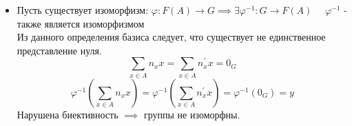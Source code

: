 \documentclass{article}
\begin{document}
\begin{enumerate}
\begin{itemize}
        \item
        Пусть существует изоморфизм: $\varphi: F(A) \to G \implies \exists \varphi^{-1}: G \to F(A)\quad$ $\varphi^{-1}$ - также является изоморфизмом \\
        Из данного определения базиса следует, что существует не единственное представление нуля. 
        $$
            \sum_{x \in A}{n_x x} = \sum_{x \in A}{n^{\prime}_{x}x} = 0_G
        $$
        $$
            \varphi^{-1}(\sum_{x \in A}{n_x x}) = \varphi^{-1}(\sum_{x \in A}{n^{\prime}_{x}x}) = \varphi^{-1}(0_G) = y
        $$
        Нарушена биективность $\implies $ группы не изоморфны.
    \end{itemize}
\end{enumerate}
\end{document}
